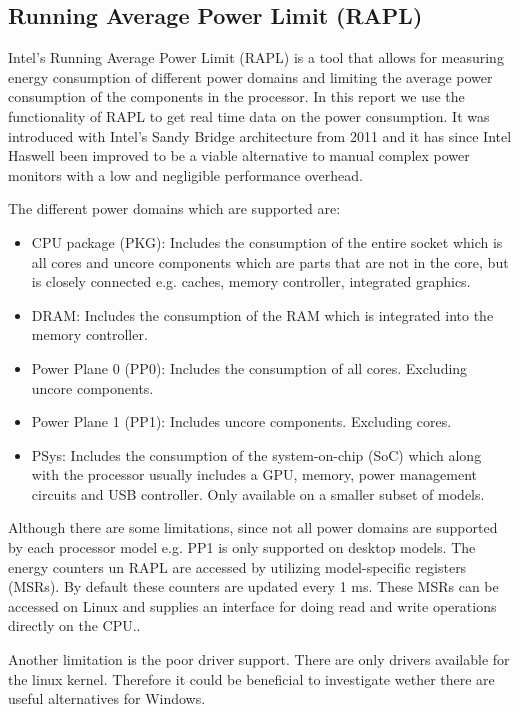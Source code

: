 \subsection{Running Average Power Limit (RAPL)}
Intel's Running Average Power Limit (RAPL) is a tool that allows for measuring energy consumption of different power domains and limiting the average power consumption of the components in the processor. In this report we use the functionality of RAPL to get real time data on the power consumption. It was introduced with Intel’s Sandy Bridge architecture from 2011 and it has since Intel Haswell been improved to be a viable alternative to manual complex power monitors with a low and negligible performance overhead. \cite{RAPL_in_action}

The different power domains which are supported are:
\begin{itemize}
    \item CPU package (PKG): Includes the consumption of the entire socket which is all cores and uncore components which are parts that are not in the core, but is closely connected e.g. caches, memory controller, integrated graphics.
    \item DRAM: Includes the consumption of the RAM which is integrated into the memory controller.  
    \item Power Plane 0 (PP0): Includes the consumption of all cores. Excluding uncore components.
    \item Power Plane 1 (PP1): Includes uncore components. Excluding cores.
    \item PSys: Includes the consumption of the system-on-chip (SoC) which along with the processor usually includes a GPU, memory, power management circuits and USB controller. Only available on a smaller subset of models.
\end{itemize}
Although there are some limitations, since not all power domains are supported by each processor model e.g. PP1 is only supported on desktop models. The energy counters un RAPL are accessed by utilizing model-specific registers (MSRs). By default these counters are updated every 1 ms. These MSRs can be accessed on Linux and supplies an interface for doing read and write operations directly on the CPU.\cite{linux_manual_msr}. \nytafsnit

Another limitation is the poor driver support. There are only drivers available for the linux kernel. Therefore it could be beneficial to investigate wether there are useful alternatives for Windows.\cite{RAPL_in_action}  

